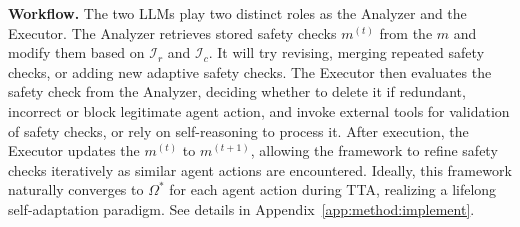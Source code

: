 \smallskip\noindent\textbf{Workflow.} The two LLMs play two distinct roles as the Analyzer and the Executor. The Analyzer retrieves stored safety checks $m^{(t)}$ from the $m$ and modify them based on $\mathcal{I}_r$ and $\mathcal{I}_c$. It will try revising, merging repeated safety checks, or adding new adaptive safety checks. The Executor then evaluates the safety check from the Analyzer, deciding whether to delete it if redundant, incorrect or block  legitimate agent action, and invoke external tools for validation of safety checks, or rely on self-reasoning to process it. After execution, the Executor updates the $m^{(t)}$ to $m^{(t+1)}$, allowing the framework to refine safety checks iteratively as similar agent actions are encountered. Ideally, this framework naturally converges to $\Omega^*$ for each agent action during TTA, realizing a lifelong self-adaptation paradigm. See details in Appendix~\ref{app:method:implement}.











